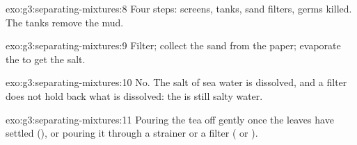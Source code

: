 \begin{solution}{exo:g3:separating-mixtures:8}
Four steps: screens,  tanks, sand filters, germs killed. The
 tanks remove the mud.
\end{solution}

\begin{solution}{exo:g3:separating-mixtures:9}
Filter; collect the sand from the paper; evaporate the  to get
the salt.
\end{solution}

\begin{solution}{exo:g3:separating-mixtures:10}
No. The salt of sea water is dissolved, and a filter does not hold back
what is dissolved: the  is still salty water.
\end{solution}

\begin{solution}{exo:g3:separating-mixtures:11}
Pouring the tea off gently once the leaves have settled (), or
pouring it through a strainer or a filter ( or ).
\end{solution}
